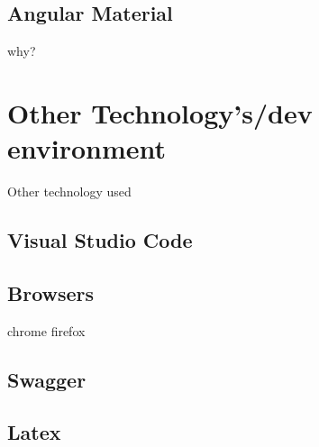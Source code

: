 \subsection{Angular Material}
why?

\section{Other Technology's/dev environment}
Other technology used
\subsection{Visual Studio Code}
\subsection{Browsers}
chrome firefox
\subsection{Swagger}
\subsection{Latex}



